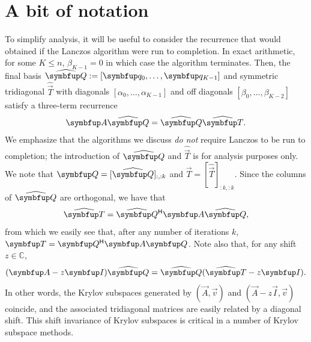 \section{A bit of notation}


To simplify analysis, it will be useful to consider the recurrence that would obtained if the Lanczos algorithm were run to completion. 
In exact arithmetic, for some $K\leq n$, $\beta_{K-1} = 0$ in which case the algorithm terminates. 
Then, the final basis \( \Qhat := [ \vec{q}_0 , \ldots , \vec{q}_{K-1} ]\) and symmetric tridiagonal $\widehat{\vec{T}}$ with  diagonals $[\alpha_0, \ldots, \alpha_{K-1}]$ and off diagonals $[\beta_0, \ldots, \beta_{K-2}]$
satisfy
 a three-term recurrence 
\begin{equation}
    \label{eqn:lanczos_three_term_complete}
    \vec{A} \Qhat = \Qhat \widehat{\vec{T}}.
\end{equation}
We emphasize that the algorithms we discuss \emph{do not} require Lanczos to be run to completion; the introduction of $\Qhat$ and $\widehat{\vec{T}}$ is for analysis purposes only.
We note that $\vec{Q} = [\Qhat]_{:,:k}$ and $\vec{T} =[\widehat{\vec{T}}]_{:k,:k}$.
Since the columns of $\Qhat$ are orthogonal, we have that
\begin{equation*}
    \widehat{\vec{T}}
    = \Qhat^\cT \vec{A} \Qhat,
\end{equation*}
from which we easily see that, after any number of iterations $k$, $\vec{T} = \vec{Q}^\cT \vec{A} \vec{Q}$.
Note also that, for any shift $z\in\mathbb{C}$, 
\begin{equation*}
    (\vec{A} - z\vec{I}) \Qhat = \Qhat (\widehat{\vec{T}} - z\vec{I}).
\end{equation*}
In other words, the Krylov subspaces generated by $(\vec{A},\vec{v})$ and $(\vec{A}-z\vec{I},\vec{v})$ coincide, and the associated tridiagonal matrices are easily related by a diagonal shift. 
This shift invariance of Krylov subspaces is critical in a number of Krylov subspace methods.



